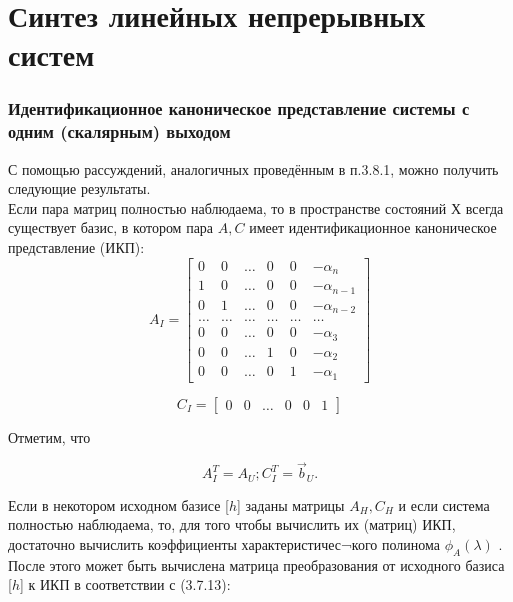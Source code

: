 \chapter{Синтез линейных непрерывных систем}
\setcounter{section}{8} %
\setcounter{subsection}{2} %
\setcounter{equation}{23} %
\setcounter{figure}{7}%

\subsection{Идентификационное каноническое представление системы с одним (скалярным) выходом}
С помощью рассуждений, аналогичных проведённым в п.3.8.1, можно получить следующие результаты.\\
Если пара матриц    полностью наблюдаема,  то  в   пространстве состояний  Х  всегда существует базис, в котором пара ${A,C}$  имеет идентификационное каноническое представление (ИКП):
\begin{equation}
	A_I = 
	\begin{bmatrix}
	    0 & 0 & \dots & 0 & 0 & -\alpha_n \\
	    1 & 0 & \dots & 0 & 0 & -\alpha_{n-1} \\
	    0 & 1 & \dots & 0 & 0 & -\alpha_{n-2} \\
	    \dots & \dots & \dots & \dots & \dots & \dots \\
	    0 & 0 & \dots & 0 & 0 & -\alpha_3 \\
	    0 & 0 & \dots & 1 & 0 & -\alpha_2 \\
	    0 & 0 & \dots & 0 & 1 & -\alpha_1
	\end{bmatrix}
\end{equation}

\begin{equation}
	C_I = 
	\begin{bmatrix}
	    0 & 0 & \dots & 0 & 0 & 1
	\end{bmatrix}
\end{equation}

Отметим, что

\begin{equation}
	A_I^T = A_U; C_I^T=\vec{b}_U.
\end{equation}

Если   в  некотором  исходном  базисе [$h$] заданы матрицы $A_H, C_H$ и если система полностью наблюдаема, то, для того чтобы вычислить их (матриц) ИКП, достаточно вычислить коэффициенты характеристичес¬кого полинома $\phi_A(\lambda)$ . После этого может быть вычислена матрица преобразования от исходного базиса [$h$] к ИКП в соответствии с (3.7.13):

